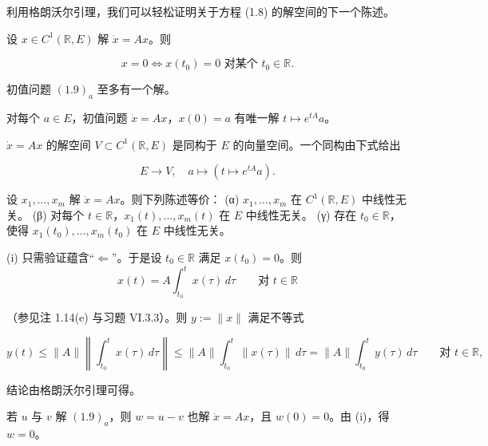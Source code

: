 利用格朗沃尔引理，我们可以轻松证明关于方程 (1.8) 的解空间的下一个陈述。

\begin{proposition}

\begin{subitems}
\item

设 $ x \in C^{1}(\mathbb{R}, E) $ 解 $ \dot{x} = Ax $。则

\[
x = 0 \iff x(t_{0}) = 0 \text{ 对某个 } t_{0} \in \mathbb{R} .
\]
\item

初值问题 $ (1.9)_{a} $ 至多有一个解。

\item

对每个 $ a \in E $，初值问题 $ \dot{x} = Ax $，$ x(0) = a $ 有唯一解 $ t \mapsto e^{tA}a $。

\item

$ \dot{x} = Ax $ 的解空间 $ V \subset C^{1}(\mathbb{R}, E) $ 是同构于 $ E $ 的向量空间。一个同构由下式给出

\[
E \to V , \quad a \mapsto (t \mapsto e^{tA}a) .
\]
\item

设 $ x_{1}, \ldots, x_{m} $ 解 $ \dot{x} = Ax $。则下列陈述等价：
(α) $ x_{1}, \ldots, x_{m} $ 在 $ C^{1}(\mathbb{R}, E) $ 中线性无关。
(β) 对每个 $ t \in \mathbb{R} $，$ x_{1}(t), \ldots, x_{m}(t) $ 在 $ E $ 中线性无关。
(γ) 存在 $ t_{0} \in \mathbb{R} $，使得 $ x_{1}(t_{0}), \ldots, x_{m}(t_{0}) $ 在 $ E $ 中线性无关。

\proofhead
(i) 只需验证蕴含“$ \Longleftarrow $”。于是设 $ t_{0} \in \mathbb{R} $ 满足 $ x(t_{0}) = 0 $。则
\[
x(t) = A\int_{t_{0}}^{t} x(\tau)\,d\tau \qquad \text{对 } t \in \mathbb{R}
\]

（参见注 1.14(e) 与习题 VI.3.3）。则 $ y := \|x\| $ 满足不等式

\[
y(t) \le \|A\|\left\| \int_{t_{0}}^{t} x(\tau)\,d\tau \right\| \le \|A\|\int_{t_{0}}^{t} \|x(\tau)\|\,d\tau = \|A\|\int_{t_{0}}^{t} y(\tau)\,d\tau \qquad \text{对 } t \in \mathbb{R} ,
\]

结论由格朗沃尔引理可得。

\end{subitems}

\begin{subitems}
\item[（ii）]

若 $ u $ 与 $ v $ 解 $ (1.9)_{a} $，则 $ w = u - v $ 也解 $ \dot{x} = Ax $，且 $ w(0) = 0 $。由 (i)，得 $ w = 0 $。


\end{subitems}
\end{proposition}
